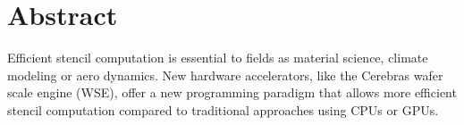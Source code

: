 \section*{Abstract}
Efficient stencil computation is essential to fields as material science, climate modeling or aero dynamics. New hardware accelerators, like the Cerebras wafer scale engine (WSE), offer a new programming paradigm that allows more efficient stencil computation compared to traditional approaches using CPUs or GPUs. 